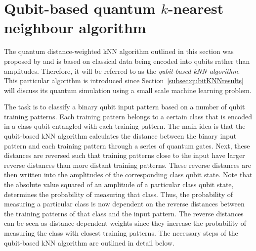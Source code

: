 \section{Qubit-based quantum $k$-nearest neighbour algorithm}
\label{subsec:quantumknearestneighbour}

The quantum distance-weighted kNN algorithm outlined in this section was proposed by  and is based on classical data being encoded into qubits rather than amplitudes. Therefore, it will be referred to as the \emph{qubit-based kNN algorithm}. This particular algorithm is introduced since Section~\ref{subsec:qubitKNNresults} will discuss its quantum simulation using a small scale machine learning problem.

The task is to classify a binary qubit input pattern based on a number of qubit training patterns. Each training pattern belongs to a certain class that is encoded in a class qubit entangled with each training pattern. The main idea is that the qubit-based kNN algorithm calculates the distance between the binary input pattern and each training pattern through a series of quantum gates. Next, these distances are reversed such that training patterns close to the input have larger reverse distances than more distant training patterns. These reverse distances are then written into the amplitudes of the corresponding class qubit state. Note that the absolute value squared of an amplitude of a particular class qubit state, determines the probability of measuring that class. Thus, the probability of measuring a particular class is now dependent on the reverse distances between the training patterns of that class and the input pattern. The reverse distances can be seen as distance-dependent weights since they increase the probability of measuring the class with closest training patterns. The necessary steps of the qubit-based kNN algorithm are outlined in detail below.

